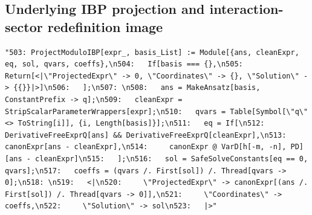\documentclass[11pt]{article}
\begin{document}
\subsection{Underlying IBP projection and interaction-sector redefinition image}
\begin{verbatim}
"503: ProjectModuloIBP[expr_, basis_List] := Module[{ans, cleanExpr, eq, sol, qvars, coeffs},\n504:   If[basis === {},\n505:     Return[<|\"ProjectedExpr\" -> 0, \"Coordinates\" -> {}, \"Solution\" -> {{}}|>]\n506:   ];\n507: \n508:   ans = MakeAnsatz[basis, ConstantPrefix -> q];\n509:   cleanExpr = StripScalarParameterWrappers[expr];\n510:   qvars = Table[Symbol[\"q\" <> ToString[i]], {i, Length[basis]}];\n511:   eq = If[\n512:     DerivativeFreeExprQ[ans] && DerivativeFreeExprQ[cleanExpr],\n513:     canonExpr[ans - cleanExpr],\n514:     canonExpr @ VarD[h[-m, -n], PD][ans - cleanExpr]\n515:   ];\n516:   sol = SafeSolveConstants[eq == 0, qvars];\n517:   coeffs = (qvars /. First[sol]) /. Thread[qvars -> 0];\n518: \n519:   <|\n520:     \"ProjectedExpr\" -> canonExpr[(ans /. First[sol]) /. Thread[qvars -> 0]],\n521:     \"Coordinates\" -> coeffs,\n522:     \"Solution\" -> sol\n523:   |>"
\end{verbatim}
\end{document}
